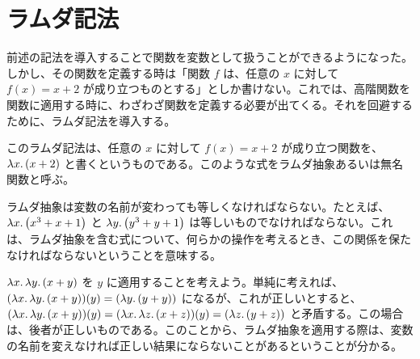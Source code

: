 \documentclass[book]{jlreq}
\newcommand{\p}[1]{ \mathord{ \left( #1 \right) } }
\begin{document}
\section{ラムダ記法}

前述の記法を導入することで関数を変数として扱うことができるようになった。しかし、その関数を定義する時は「関数 \( f \) は、任意の \( x \) に対して \( f \p{ x } = x + 2 \) が成り立つものとする」としか書けない。これでは、高階関数を関数に適用する時に、わざわざ関数を定義する必要が出てくる。それを回避するために、ラムダ記法を導入する。

このラムダ記法は、任意の \( x \) に対して \( f \p{ x } = x + 2 \) が成り立つ関数を、 \( \lambda x \ldotp \p{ x + 2 } \) と書くというものである。このような式をラムダ抽象あるいは無名関数と呼ぶ。

ラムダ抽象は変数の名前が変わっても等しくなければならない。たとえば、 \( \lambda x \ldotp \p{ x^3 + x + 1 } \) と \( \lambda y \ldotp \p{ y^3 + y + 1 } \) は等しいものでなければならない。これは、ラムダ抽象を含む式について、何らかの操作を考えるとき、この関係を保たなければならないということを意味する。

\( \lambda x \ldotp \lambda y \ldotp \p{ x + y } \) を \( y \) に適用することを考えよう。単純に考えれば、 \( \p{ \lambda x \ldotp \lambda y \ldotp \p{ x + y } } \p{ y } = \p{ \lambda y \ldotp \p{ y + y } } \) になるが、これが正しいとすると、 \( \p{ \lambda x \ldotp \lambda y \ldotp \p{ x + y } } \p{ y } = \p{ \lambda x \ldotp \lambda z \ldotp \p{ x + z } } \p{ y } = \p{ \lambda z \ldotp \p{ y + z } } \) と矛盾する。この場合は、後者が正しいものである。このことから、ラムダ抽象を適用する際は、変数の名前を変えなければ正しい結果にならないことがあるということが分かる。
\end{document}
